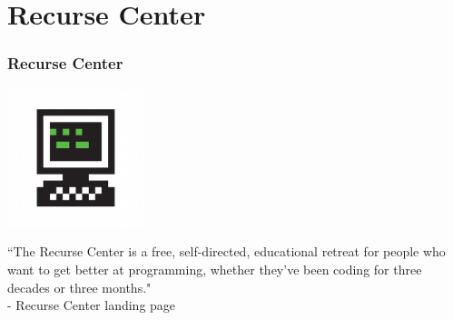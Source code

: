 \documentclass{beamer}
\theoremstyle{mystyle}
\begin{document}
\section{Recurse Center}
\frame{\tableofcontents[currentsection]}

\begin{frame}
\frametitle{Recurse Center}

\begin{center}
	\includegraphics[width=0.3\textwidth]{recurse_center.png}
\end{center}

\begin{center}
``The Recurse Center is a free, self-directed, educational retreat for people who want to get better at programming, whether they've been coding for three decades or three months." \\


- Recurse Center landing page
\end{center}

\end{frame}

\end{document}
